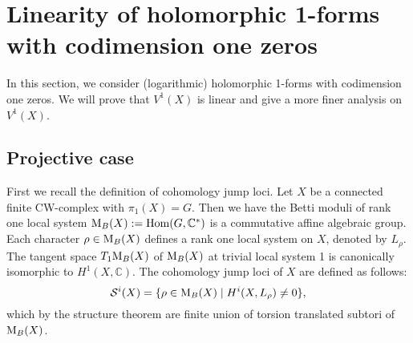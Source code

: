 \documentclass[a4paper,12pt,reqno]{amsart}
\theoremstyle{plain}
\theoremstyle{definition}
\theoremstyle{remark}
\newcommand{\C}{\mathbb C}
\newcommand{\Hom}{\operatorname{Hom}}
\begin{document}



\section{Linearity of holomorphic 1-forms with codimension one zeros}

In this section, we consider (logarithmic) holomorphic 1-forms with codimension one zeros. We will prove that $V^1(X)$ is linear and give a more finer analysis on $V^1(X)$. 

\subsection{Projective case}


First we recall the definition of cohomology jump loci. Let $X$ be a connected finite CW-complex with $\pi_{1}(X)=G$. Then we have the Betti moduli of rank one local system $\textnormal{M}_B(X):= \Hom(G,\C^{\ast})$ is a commutative affine algebraic group. Each character $\rho \in \textnormal{M}_B(X)$ defines a rank one local system on $X$, denoted by $L_{\rho}$. The tangent space $T_1\textnormal{M}_B(X)$ of $\textnormal{M}_B(X)$ at trivial local system 1 is canonically isomorphic to $H^1(X, \C)$.
The cohomology jump loci of $X$ are defined as follows:
$$\mathcal{S}^i(X)=\lbrace \rho\in \textnormal{M}_B(X) \mid  H^{i}(X, L_{\rho})\neq 0 \rbrace,$$ 
which by the structure theorem are finite union of torsion translated subtori of $\textnormal{M}_B(X)$.
\end{document}
